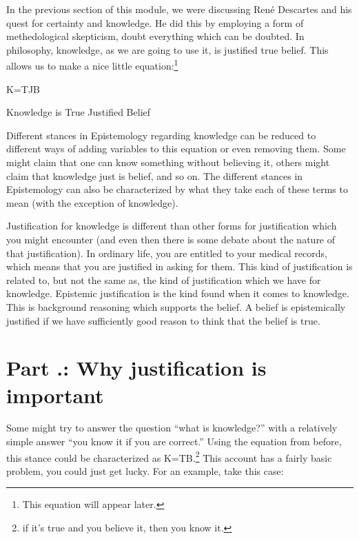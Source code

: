 In the previous section of this module, we were discussing Ren\'e Descartes and his quest for certainty and knowledge. He did this by employing a form of methedological skepticism, doubt everything which can be doubted. In philosophy, \gls{knowledge}, as we are going to use it, is justified true belief. This allows us to make a nice little equation:\footnote{This equation will appear later.}

\begin{center}

K=TJB

Knowledge is True Justified Belief
\end{center}

Different stances in Epistemology regarding knowledge can be reduced to different ways of adding variables to this equation or even removing them. Some might claim that one can know something without believing it, others might claim that knowledge just is belief, and so on. The different stances in Epistemology can also be characterized by what they take each of these terms to mean (with the exception of knowledge). 

Justification for knowledge is different than other forms for justification which you might encounter (and even then there is some debate about the nature of that justification). In ordinary life, you are entitled to your medical records, which means that you are justified in asking for them. This kind of justification is related to, but not the same as, the kind of justification which we have for knowledge. Epistemic justification is the kind found when it comes to knowledge. This is background reasoning which supports the belief. A belief is epistemically justified if we have sufficiently good reason to think that the belief is true. 
\section{Part \thechapcount.\theseccount: Why justification is important}

Some might try to answer the question ``what is knowledge?'' with a relatively simple answer ``you know it if you are correct.'' Using the equation from before, this stance could be characterized as K=TB.\footnote{if it's true and you believe it, then you know it.} This account has a fairly basic problem, you could just get lucky. For an example, take this case:


